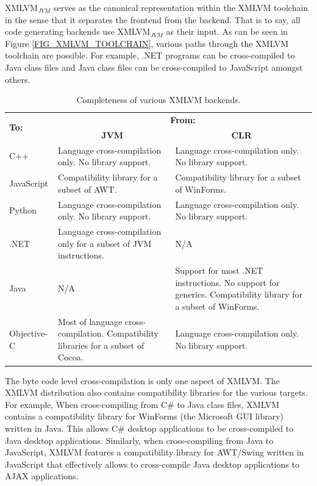 \documentclass[11pt]{book}
\begin{document}
XMLVM$_{JVM}$ serves as the canonical representation within the XMLVM
toolchain in the sense that it separates the frontend from the
backend. That is to say, all code generating backends use
XMLVM$_{JVM}$ as their input. As can be seen in Figure
\ref{FIG_XMLVM_TOOLCHAIN}, various paths through the XMLVM toolchain
are possible. For example, .NET programs can be cross-compiled to Java
class files and Java class files can be cross-compiled to JavaScript
amongst others.


\begin{table}[h]
\caption{\label{TAB_XMLVM_COMPLETENESS} Completeness of various XMLVM backends.}
\centering
\begin{tabular}{|l||p{4.5cm}|p{4.5cm}|}
\hline
\multirow{2}{*}{\textbf{To:}}
    & \multicolumn{2}{c|}{\textbf{From:}} \\ \cline{2-3}
    & \multicolumn{1}{c|}{\textbf{JVM}}
    & \multicolumn{1}{c|}{\textbf{CLR}} \\ \hline \hline
C++
    & Language cross-compilation only. No library support.
    & Language cross-compilation only. No library support.  \\ \hline
JavaScript
    & Compatibility library for a subset of AWT.
    & Compatibility library for a subset of WinForms. \\ \hline
Python
    & Language cross-compilation only. No library support.
    & Language cross-compilation only. No library support. \\ \hline
.NET
    & Language cross-compilation only for a subset of JVM instructions.
    & N/A \\ \hline
Java
    & N/A
    & Support for most .NET instructions. No support for generics.
      Compatibility library for a subset of WinForms. \\ \hline
Objective-C
    & Most of language cross-compilation. Compatibility libraries
      for a subset of Cocoa.
    & Language cross-compilation only. No library support. \\ \hline
\end{tabular}
\end{table}


The byte code level cross-compilation is only one aspect of XMLVM. The
XMLVM distribution also contains compatibility libraries for the
various targets. For example, When cross-compiling from C\# to
Java class files, XMLVM contains a compatibility library for WinForms (the
Microsoft GUI library) written in Java. This allows C\# desktop
applications to be cross-compiled to Java desktop applications. Similarly,
when cross-compiling from Java to JavaScript, XMLVM features a
compatibility library for AWT/Swing written in JavaScript that
effectively allows to cross-compile Java desktop applications to AJAX
applications.
\end{document}
